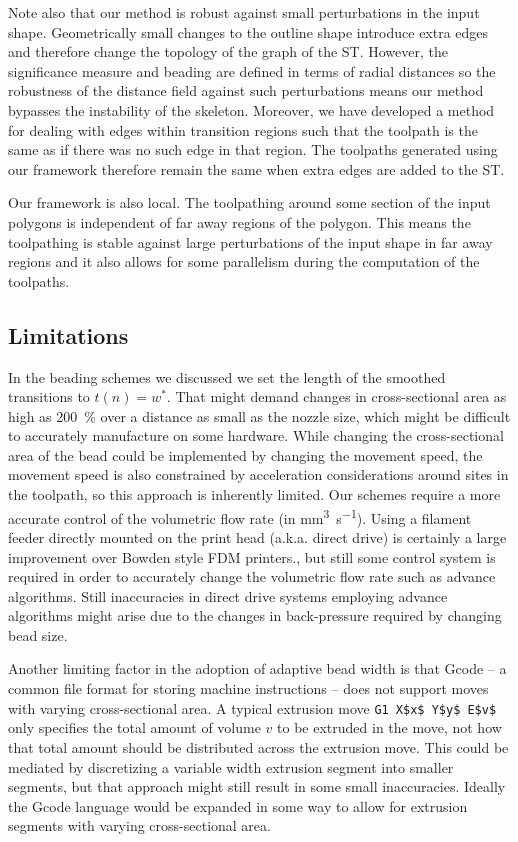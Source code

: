 Note also that our method is robust against small perturbations in the input shape.
Geometrically small changes to the outline shape introduce extra edges and therefore change the topology of the graph of the ST.
However, the significance measure and beading are defined in terms of radial distances so the robustness of the distance field against such perturbations means our method bypasses the instability of the skeleton.
Moreover, we have developed a method for dealing with edges within transition regions such that the toolpath is the same as if there was no such edge in that region.
The toolpaths generated using our framework therefore remain the same when extra edges are added to the ST.

Our framework is also local.
The toolpathing around some section of the input polygons is independent of far away regions of the polygon.
This means the toolpathing is stable against large perturbations of the input shape in far away regions
and it also allows for some parallelism during the computation of the toolpaths.



\subsection{Limitations}
In the beading schemes we discussed we set the length of the smoothed transitions to $t(n) = w^*$.
That might demand changes in cross-sectional area as high as \SI{200}{\percent} over a distance as small as the nozzle size,
which might be difficult to accurately manufacture on some hardware.
While changing the cross-sectional area of the bead could be implemented by changing the movement speed, the movement speed is also constrained by acceleration considerations around sites in the toolpath, so this approach is inherently limited.
Our schemes require a more accurate control of the volumetric flow rate (in \si{\milli\meter\cubed\per\second}).
Using a filament feeder directly mounted on the print head (a.k.a. direct drive) is certainly a large improvement over Bowden style FDM printers.,
but still some control system is required in order to accurately change the volumetric flow rate such as advance algorithms. \cite{tronvoll2019investigating}
Still inaccuracies in direct drive systems employing advance algorithms might arise due to the changes in back-pressure required by changing bead size.


Another limiting factor in the adoption of adaptive bead width is that Gcode -- a common file format for storing machine instructions -- does not support  moves with varying cross-sectional area.
A typical extrusion move \lstinline{G1 X$x$ Y$y$ E$v$} only specifies the total amount of volume $v$ to be extruded in the move, not how that total amount should be distributed across the extrusion move.
This could be mediated by discretizing a variable width extrusion segment into smaller segments, but that approach might still result in some small inaccuracies.
Ideally the Gcode language would be expanded in some way to allow for extrusion segments with varying cross-sectional area.


